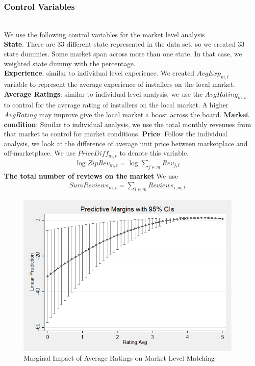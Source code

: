 \documentclass[msom,blindrev]{informs3}
\begin{document}
\subsubsection{Control Variables}\hfill\\
We use the following control variables for the market level analysis\\
\textbf{State}. There are 33 different state represented in the data set, so we created 33 state dummies. Some market span across more than one state. In that case, we weighted state dummy with the percentage. \\
\textbf{Experience}: similar to individual level experience. We created $AvgExp_{m,t}$ variable to represent the average experience of installers on the local market. \\
\textbf{Average Ratings}: similar to individual level analysis, we use the $AvgRating_{m,t}$ to control for the average rating of installers on the local market. A higher $AvgRating$ may improve give the local market a boost across the board.
\textbf{Market condition}:
Similar to individual analysis, we use the total monthly revenues from that market to control for market conditions.
\textbf{Price}: Follow the individual analysis, we look at the difference of average unit price between marketplace and off-marketplace. We use $PriceDiff_{m,t}$ to denote this variable.  \\
\begin{align*}
\log ZipRev_{m,t}=\log \sum_{j\in m}Rev_{j,t}
\end{align*}
 \textbf{The total number of reviews on the market } We use
\begin{align*}
SumReviews_{m,t}=\sum_{i\in m} Reviews_{i,m,t}
\end{align*}





\begin{figure}
	\centering
	\includegraphics[width=0.7\linewidth]{marginsplot_mkt_0.png}
	\caption{Marginal Impact of Average Ratings on Market Level Matching}
	\label{marginsplot_mkt_0}
\end{figure}
\end{document}
